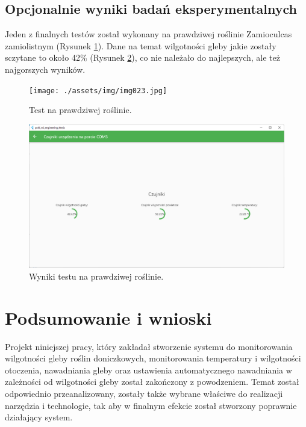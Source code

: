 \documentclass[a4paper,twoside,12pt]{book}
\begin{document}
\section{Opcjonalnie wyniki badań eksperymentalnych}

Jeden z finalnych testów został wykonany na prawdziwej roślinie Zamioculcas zamiolistnym (Rysunek \ref{fig:23}). Dane na temat wilgotności gleby jakie zostały sczytane to około 42\% (Rysunek \ref{fig:24}), co nie należało do najlepszych, ale też najgorszych wyników.

\begin{figure}[H]
   \centering
   \texttt{[image: ./assets/img/img023.jpg]}
   \caption{Test na prawdziwej roślinie.}
   \label{fig:23}
\end{figure}

\begin{figure}[H]
   \centering
   \includegraphics[width=\textwidth]{./assets/img/img024.png}
   \caption{Wyniki testu na prawdziwej roślinie.}
   \label{fig:24}
\end{figure}

\chapter{Podsumowanie i wnioski}

Projekt niniejszej pracy, który zakładał stworzenie systemu do monitorowania wilgotności gleby roślin doniczkowych, monitorowania temperatury i wilgotności otoczenia, nawadniania gleby oraz ustawienia automatycznego nawadniania w zależności od wilgotności gleby został zakończony z powodzeniem. Temat został odpowiednio przeanalizowany, zostały także wybrane właściwe do realizacji narzędzia i technologie, tak aby w finalnym efekcie został stworzony poprawnie działający system.
\end{document}
